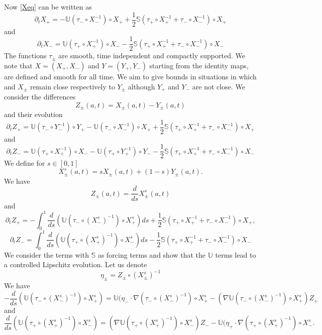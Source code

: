 \documentclass[11pt,reqno]{amsproc}
\newcommand{\pa}{\partial}
\newcommand{\la}{\label}
\newcommand{\fr}{\frac}
\newcommand{\na}{\nabla}
\newcommand{\be}{\begin{equation}}
\newcommand{\ee}{\end{equation}}
\begin{document}
Now \eqref{Xeq} can be written as
\be
\pa_t X_+ = -\mathbb U\left (\tau_-\circ X_-^{-1}\right)\circ X_{+}  + \fr{1}{2}\mathbb S\left(\tau_+\circ X_{+}^{-1} + \tau_-\circ X_-^{-1}\right)\circ X_{+}
\la{XplSeq}
\ee
and
\be
\pa_t X_- = \mathbb U\left (\tau_+\circ X_+^{-1}\right)\circ X_{-}  - \fr{1}{2}\mathbb S\left(\tau_+\circ X_{+}^{-1} + \tau_-\circ X_-^{-1}\right)\circ X_{-}
\la{XminSeq}
\ee
The functions $\tau_{\pm}$ are smooth, time independent and compactly supported. We note that
 $X= (X_+, X_-)$ and $Y = (Y_+, Y_-)$  starting from the identity maps, are defined and smooth for all time. 
 We aim to give bounds in  situations in which  and $X_\pm$ remain close respectively to $Y_\pm$ although $Y_+$ and $Y_-$ are not close. We consider the differences
\be
Z_{\pm}(a,t) = X_{\pm}(a,t)- Y_{\pm}(a,t)
\la{Zpm}
\ee
and their evolution
\be
\pa_t Z_{+} = \mathbb U\left (\tau_-\circ Y_-^{-1}\right)\circ Y_{+} -\mathbb U\left (\tau_-\circ X_-^{-1}\right)\circ X_{+} + \fr{1}{2}\mathbb S\left(\tau_+\circ X_{+}^{-1} + \tau_-\circ X_-^{-1}\right)\circ X_{+}
\la{Zpleq}
\ee
and
\be
\pa_t Z_{-} =  \mathbb U\left (\tau_+\circ X_+^{-1}\right)\circ X_{-} -\mathbb U\left (\tau_+\circ Y_+^{-1}\right)\circ Y_{-} - \fr{1}{2}\mathbb S\left(\tau_+\circ X_{+}^{-1} + \tau_-\circ X_-^{-1}\right)\circ X_{-}
\la{Zmineq}
\ee
We define for $s\in [0,1]$
\be
X_{\pm}^s(a,t) = s X_{\pm}(a,t) + (1- s) Y_{\pm}(a,t).
\la{Xmpms}
\ee
We have
\be 
Z_{\pm}(a,t) = \fr{d}{ds} X^s_{\pm}(a,t)
\la{Zds}
\ee
and 
\be
\pa_t Z_{+} = -\int_0^1 \fr{d}{ds}\left(\mathbb U\left (\tau_-\circ (X^s_-)^{-1}\right)\circ X_+^s\right) ds 
+ \fr{1}{2}\mathbb S\left(\tau_+\circ X_{+}^{-1} + \tau_-\circ X_-^{-1}\right)\circ X_{+},
\la{Zplds}
\ee
\be
\pa_tZ_- = \int_0^1\fr{d}{ds}\left(\mathbb U\left (\tau_+\circ (X_+^s)^{-1}\right)\circ X_{-}^s\right)ds 
 - \fr{1}{2}\mathbb S\left(\tau_+\circ X_{+}^{-1} + \tau_-\circ X_-^{-1}\right)\circ X_{-}
\la{Zminds}
\ee
We consider the terms with $\mathbb S$ as forcing terms and show that the $\mathbb U$ terms lead to a controlled Lipschitz evolution. Let us denote
\be
\eta_{\pm} = Z_{\pm}\circ (X^s_{\pm})^{-1}
\ee
We have
\be
-\fr{d}{ds}\left( \mathbb U\left (\tau_-\circ (X^s_-)^{-1}\right)\circ X_+^s\right)  = 
\mathbb U(\eta_-\cdot\nabla(\tau_-\circ (X^s_-)^{-1})\circ X_+^s  - (\na\mathbb U(\tau_-\circ (X^s_-)^{-1})\circ X_+^s)Z_+
\la{dsUplus}
\ee
and 
\be
\fr{d}{ds} \left(\mathbb U\left (\tau_+\circ (X_+^s)^{-1}\right)\circ X_{-}^s\right) = (\na\mathbb U(\tau_+\circ (X^s_+)^{-1})\circ X_-^s)Z_- -\mathbb U(\eta_+\cdot\nabla(\tau_+\circ (X^s_+)^{-1})\circ X_-^s.
\la{dsUminus}
\ee
\end{document}

